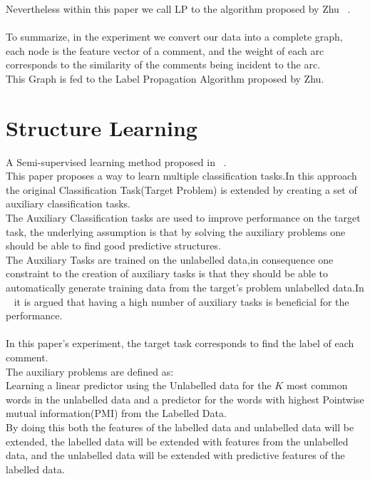 \documentclass[4pt,a4paper,twocolumn]{article}
\begin{document}
Nevertheless within this paper we call LP to the algorithm proposed by Zhu ~\cite{Zhu:2005:SLG:1104523}.\\
\\
To summarize, in the experiment we convert our data into a complete graph,
each node is the feature vector of a comment, and the weight of each arc
corresponds to the similarity of the comments being incident to the arc.\\
This Graph is  fed to the Label Propagation Algorithm proposed by Zhu.\\



 
\section{Structure Learning}
A Semi-supervised learning method proposed in ~\cite{Ando:2005:FLP:1046920.1194905}.\\
This paper proposes a way to learn multiple classification tasks.In this approach the original Classification Task(Target Problem) is extended by creating a set of auxiliary classification tasks.\\
The Auxiliary Classification tasks are used to improve performance on the target task,
the underlying assumption is that by solving the auxiliary problems one should be able to find good predictive structures.\\
The Auxiliary Tasks are trained on the unlabelled data,in consequence one constraint to the creation of auxiliary tasks is that they should be able to automatically generate training data from the target's problem unlabelled data.In ~\cite{Ando:2005:HSL:1219840.1219841} it is argued that having a high number of auxiliary tasks is beneficial for the performance.\\
\\
In this paper's experiment, the target task corresponds to find the label of each comment.\\
The auxiliary problems are defined as:\\
Learning a linear predictor using the Unlabelled data for the $K$ most common words in the unlabelled data and a predictor for the words with highest Pointwise mutual information(PMI) from the Labelled Data.\\
By doing this both the features of the labelled data and unlabelled data will be extended, the labelled data will be extended with features from the unlabelled data, and the unlabelled data will be extended with predictive features of the labelled data.\\
\end{document}
